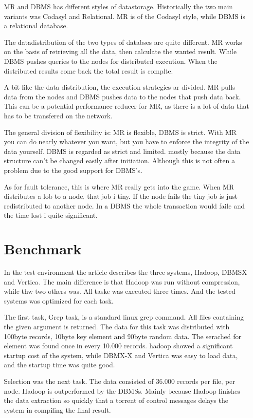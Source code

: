 \documentclass[11pt, a4paper]{article}
\begin{document}
MR and DBMS has different styles of datastorage. Historically the two main variants was Codasyl and Relational. 
MR is of the Codasyl style, while DBMS is a relational database. 

The datadistribution of the two types of databses are quite different. 
MR works on the basis of retrieving all the data, then calculate the wanted result. 
While DBMS pushes queries to the nodes for distributed execution. When the distributed results come back the total result is complte. 

A bit like the data distribution, the execution strategies ar divided. 
MR pulls data from the nodes and DBMS pushes data to the nodes that push data back. 
This can be a potential performance reducer for MR, as there is a lot of data that has to be transfered on the network. 

The general division of flexibility is: MR is flexible, DBMS is strict. 
With MR you can do nearly whatever you want, but you have to enforce the integrity of the data yourself. 
DBMS is regarded as strict and limited. mostly because the data structure can't be changed easily after initiation.
Although this is not often a problem due to the good support for DBMS's.

As for fault tolerance, this is where MR really gets into the game. 
When MR distributes a lob to a node, that job i tiny. If the node fails the tiny job is just redistributed to another node. 
In a DBMS the whole transaction would faile and the time lost i quite significant. 

\section{Benchmark}
In the test environment the article describes the three systems, Hadoop, DBMSX and Vertica. 
The main difference is that Hadoop was run without compression, while thw two others was. 
All taske was executed three times. And the tested systems was optimized for each task. 

The first task, Grep task, is a standard linux grep command. All files containing the given argument is returned. 
The data for this task was distributed with 100byte records, 10byte key element and 90byte random data. 
The serached for element was found once in every 10.000 records. 
hadoop showed a significant startup cost of the system, while DBMX-X and Vertica was easy to load data, and the startup time was quite good. 

Selection was the next task. The data consisted of 36.000 records per file, per node. 
Hadoop is outperformed by the DBMSs. Mainly because Hadoop finishes the data extraction so quickly that a torrent of control messages delays the system in compiling the final result. 
\end{document}
